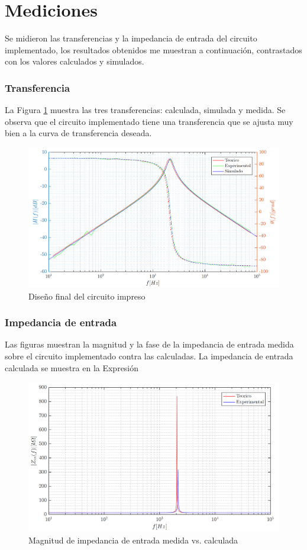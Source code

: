 \section{Mediciones}
Se midieron las transferencias y la impedancia de entrada del circuito implementado, los resultados obtenidos me muestran a continuación, contrastados con los valores calculados y simulados.

\subsubsection{Transferencia}
La Figura \ref{1_bode} muestra las tres transferencias: calculada, simulada y medida. Se observa que el circuito implementado tiene una transferencia que se ajusta muy bien a la curva de transferencia deseada.

\begin{figure}[ht]
\centering
\includegraphics[scale=0.4]{../parte1/informe/resources/bode_todos}
\caption{Diseño final del circuito impreso}
\label{1_bode}
\end{figure}

\subsubsection{Impedancia de entrada}
Las figuras muestran la magnitud y la fase de la impedancia de entrada medida sobre el circuito implementado contra las calculadas. La impedancia de entrada calculada se muestra en la Expresión

\begin{figure}[H]
\centering
\includegraphics[scale=0.4]{../parte1/informe/resources/impedancia_entrada_mag}
\caption{Magnitud de impedancia de entrada medida vs. calculada}
\label{1_zin_mag}
\end{figure}

